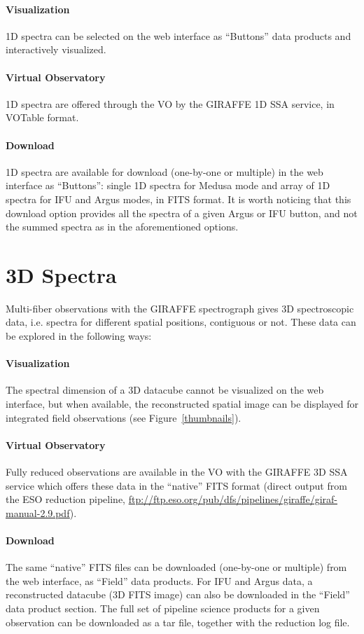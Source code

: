 \paragraph{Visualization} 1D spectra can be selected on the web interface as ``Buttons'' data products and interactively visualized.
\paragraph{Virtual Observatory} 1D spectra are offered through the VO by the GIRAFFE 1D SSA service, in VOTable format.
\paragraph{Download} 1D spectra are available for download (one-by-one or multiple) in the web interface as ``Buttons'': single 1D spectra for Medusa mode and array of 1D spectra for IFU and Argus modes, in FITS format. It is worth noticing that this download option provides all the spectra of a given Argus or IFU button, and not the summed spectra as in the aforementioned options. 

\section{3D Spectra}

Multi-fiber observations with the GIRAFFE spectrograph gives 3D spectroscopic data, i.e. spectra for different spatial positions, contiguous or not. These data can be explored in the following ways:
\paragraph{Visualization} The spectral dimension of a 3D datacube cannot be visualized on the web interface, but when available, the reconstructed spatial image can be displayed for integrated field observations (see Figure~\ref{thumbnails}).
\paragraph{Virtual Observatory} Fully reduced observations are available in the VO with the GIRAFFE 3D SSA service which offers these data in the ``native'' FITS format (direct output from the ESO reduction pipeline, \url{ftp://ftp.eso.org/pub/dfs/pipelines/giraffe/giraf-manual-2.9.pdf}).
\paragraph{Download} The same ``native'' FITS files can be downloaded (one-by-one or multiple) from the web interface, as ``Field'' data products. For IFU and Argus data, a reconstructed datacube (3D FITS image) can also be downloaded in the ``Field''  data product section. The full set of pipeline science products for a given observation can be downloaded as a tar file, together with the reduction log file. 

